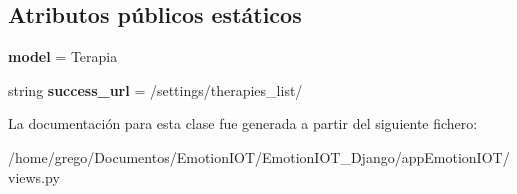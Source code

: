 \subsection*{Atributos públicos estáticos}
\begin{DoxyCompactItemize}
\item 
{\bfseries model} = Terapia\hypertarget{classappEmotionIOT_1_1views_1_1Terapia__delete_abc65a37350d89496badb5ff761eb6873}{}\label{classappEmotionIOT_1_1views_1_1Terapia__delete_abc65a37350d89496badb5ff761eb6873}

\item 
string {\bfseries success\+\_\+url} = \textquotesingle{}/settings/therapies\+\_\+list/\textquotesingle{}\hypertarget{classappEmotionIOT_1_1views_1_1Terapia__delete_a9a4ccd0d5177d72b95de0d9baf340c19}{}\label{classappEmotionIOT_1_1views_1_1Terapia__delete_a9a4ccd0d5177d72b95de0d9baf340c19}

\end{DoxyCompactItemize}


La documentación para esta clase fue generada a partir del siguiente fichero\+:\begin{DoxyCompactItemize}
\item 
/home/grego/\+Documentos/\+Emotion\+I\+O\+T/\+Emotion\+I\+O\+T\+\_\+\+Django/app\+Emotion\+I\+O\+T/views.\+py\end{DoxyCompactItemize}
